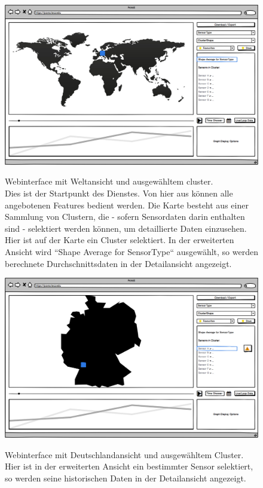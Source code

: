 \begin{figure}[H]
	\centering
		\includegraphics[width=0.9\linewidth]{gui/frontend/FrontGUIWorldWithShapeSelection.png}\\
	\caption{Webinterface mit Weltansicht und ausgewähltem \gls{cluster}.\\
	Dies ist der Startpunkt des Dienstes. Von hier aus können alle angebotenen Features bedient werden. Die Karte besteht aus einer Sammlung von Clustern, die - sofern Sensordaten darin enthalten sind - selektiert werden können, um detaillierte Daten einzusehen.\\
	Hier ist auf der Karte ein Cluster selektiert. In der erweiterten Ansicht wird ``Shape Average for SensorType`` ausgewählt, so werden berechnete Durchschnittsdaten in der Detailansicht angezeigt.}
\end{figure}

\begin{figure}[H]
	\centering
		\includegraphics[width=0.9\linewidth]{gui/frontend/FrontGUIGermanyWithShapeSelection.png}\\
	\caption{Webinterface mit Deutschlandansicht und ausgewähltem Cluster.\\
	Hier ist in der erweiterten Ansicht ein bestimmter Sensor selektiert, so werden seine historischen Daten in der Detailansicht angezeigt.}
\end{figure}

